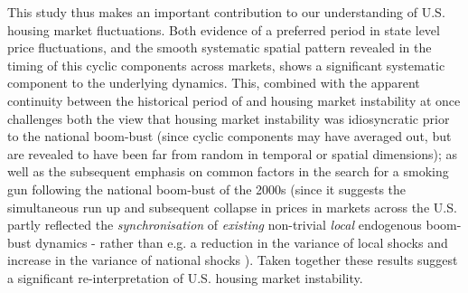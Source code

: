 \documentclass[11pt]{article}
\begin{document}
This study thus makes an important contribution to our understanding of U.S. housing market fluctuations. Both evidence of a preferred period in state level price fluctuations, and the smooth systematic spatial pattern revealed in the timing of this cyclic components across markets, shows a significant systematic component to the underlying dynamics. This, combined with the apparent continuity between the historical period of  and  housing market instability at once challenges both the view that housing market instability was idiosyncratic prior to the national boom-bust (since cyclic components may have averaged out, but are revealed to have been far from random in temporal or spatial dimensions); as well as the subsequent emphasis on common factors in the search for a smoking gun following the national boom-bust of the 2000s (since it suggests the simultaneous run up and subsequent collapse in prices in markets across the U.S. partly reflected the \textit{synchronisation} of \textit{existing} non-trivial \textit{local} endogenous boom-bust dynamics - rather than e.g. a reduction in the variance of local shocks and increase in the variance of national shocks \citep{DelNegro2007}). Taken together these results suggest a significant re-interpretation of U.S. housing market instability.




\end{document}
